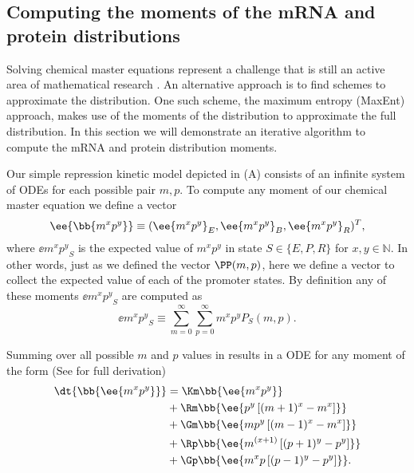 \subsection{Computing the moments of the mRNA and protein distributions}
\label{sec_moments}

Solving chemical master equations represent a challenge that is still an active
area of mathematical research \cite{Dinh2016}. An alternative approach is to
find schemes to approximate the distribution. One such scheme, the maximum
entropy (MaxEnt) approach, makes use of the moments of the distribution to
approximate the full distribution. In this section we will demonstrate an
iterative algorithm to compute the mRNA and protein distribution moments.

Our simple repression kinetic model depicted in (A)
consists of an infinite system of ODEs for each possible pair $m, p$. To
compute any moment of our chemical master equation we define a vector
\begin{equation}
	\ee{\bb{m^x p^y}} \equiv (\ee{m^x p^y}_E, \ee{m^x p^y}_B, \ee{m^x p^y}_R)^T,
\end{equation}
where $\ee{m^x p^y}_S$ is the expected value of $m^x p^y$ in state $S \in \{E,
P, R\}$ for $x, y \in \mathbb{N}$. In other words, just as we defined the vector
$\PP(m, p)$, here we define a vector to collect the expected value of each of
the promoter states. By definition any of these moments $\ee{m^x p^y}_S$ are
computed as
\begin{equation}
  \ee{m^x p^y}_S \equiv \sum_{m=0}^\infty \sum_{p=0}^\infty m^x p^y P_S(m, p).
  \label{eq_mom_def}
\end{equation}

Summing over all possible $m$ and $p$ values in  results in
a ODE for any moment of the form (See  for full derivation)
\begin{equation}
  \begin{aligned}
    \dt{\bb{\ee{m^x p^y}}} &=
    \Km \bb{\ee{m^x p^y}}\\
    &+ \Rm \bb{\ee{p^y \left[ (m + 1)^x -m^x \right]}}\\
    &+ \Gm \bb{\ee{m p^y \left[ (m - 1)^x - m^x \right]}}\\
    &+ \Rp \bb{\ee{m^{(x + 1)} \left[ (p + 1)^y - p^y \right]}}\\
    &+ \Gp \bb{\ee{m^x p \left[ (p - 1)^y - p^y \right]}}.
    \label{eq_gral_mom}
  \end{aligned}
\end{equation}

